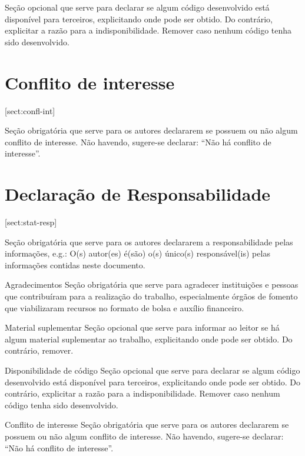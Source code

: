 \documentclass[%
  a4paper,%
  12pt,%
  fleqn,%
  english,%
  brazilian,%
]{article}
\begin{document}
\begin{OverleafFreePlan}
{  Seção opcional que serve para declarar se algum código desenvolvido está disponível para terceiros, explicitando onde pode ser obtido.
  Do contrário, explicitar a razão para a indisponibilidade.
  Remover caso nenhum código tenha sido desenvolvido.

  \section*{Conflito de interesse}[sect:confl-int]

  Seção obrigatória que serve para os autores declararem se possuem ou não algum conflito de interesse.
  Não havendo, sugere-se declarar: \enquote{Não há conflito de interesse}.

  \section*{Declaração de Responsabilidade}[sect:stat-resp]

  Seção obrigatória que serve para os autores declararem a responsabilidade pelas informações, e.g.:
  O{(s)} autor{(es)} é{(são)} o{(s)} único{(s)} responsável{(is)} pelas informações contidas neste documento.
}{%
  \begin{InfoSection}{Agradecimentos}
  Seção obrigatória que serve para agradecer instituições e pessoas que contribuíram para a realização do trabalho, especialmente órgãos de fomento que viabilizaram recursos no formato de bolsa e auxílio financeiro.
  \end{InfoSection}

  \begin{InfoSection}{Material suplementar}
  Seção opcional que serve para informar ao leitor se há algum material suplementar ao trabalho, explicitando onde pode ser obtido.
  Do contrário, remover.
  \end{InfoSection}

  \begin{InfoSection}{Disponibilidade de código}
  Seção opcional que serve para declarar se algum código desenvolvido está disponível para terceiros, explicitando onde pode ser obtido.
  Do contrário, explicitar a razão para a indisponibilidade.
  Remover caso nenhum código tenha sido desenvolvido.
  \end{InfoSection}

  \begin{InfoSection}{Conflito de interesse}
  Seção obrigatória que serve para os autores declararem se possuem ou não algum conflito de interesse.
  Não havendo, sugere-se declarar: \enquote{Não há conflito de interesse}.
  \end{InfoSection}

}
\end{OverleafFreePlan}
\end{document}
